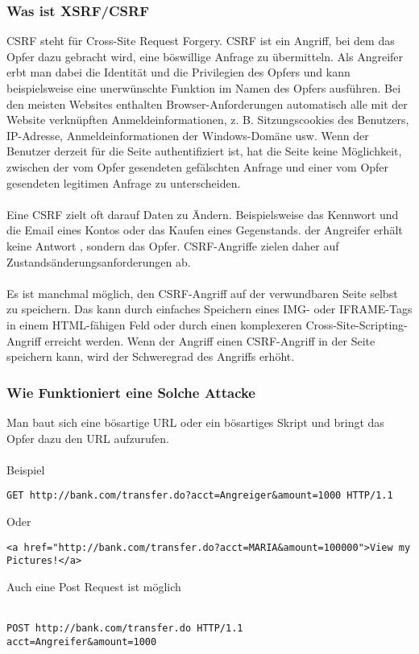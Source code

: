 {\subsubsection{Was ist XSRF/CSRF}
\label{sec:xsrf_what}
CSRF steht für Cross-Site Request Forgery. CSRF ist ein Angriff, bei dem das Opfer dazu gebracht wird, eine böswillige Anfrage zu übermitteln. Als Angreifer erbt man dabei die Identität und die Privilegien des Opfers und kann beispielsweise eine unerwünschte Funktion im Namen des Opfers ausführen. Bei den meisten Websites enthalten Browser-Anforderungen automatisch alle mit der Website verknüpften Anmeldeinformationen, z. B. Sitzungscookies des Benutzers, IP-Adresse, Anmeldeinformationen der Windows-Domäne usw. Wenn der Benutzer derzeit für die Seite authentifiziert ist, hat die Seite keine Möglichkeit, zwischen der vom Opfer gesendeten gefälschten Anfrage und einer vom Opfer gesendeten legitimen Anfrage zu unterscheiden.
\\ \\
Eine CSRF zielt oft darauf Daten zu Ändern. Beispielsweise das Kennwort und die Email eines Kontos oder das Kaufen eines Gegenstands.   der Angreifer erhält keine Antwort , sondern das Opfer. CSRF-Angriffe zielen daher auf Zustandsänderungsanforderungen ab.
\\ \\
Es ist manchmal möglich, den CSRF-Angriff auf der verwundbaren Seite selbst zu speichern. Das kann durch einfaches Speichern eines IMG- oder IFRAME-Tags in einem HTML-fähigen Feld oder durch einen komplexeren Cross-Site-Scripting-Angriff erreicht werden. Wenn der Angriff einen CSRF-Angriff in der Seite speichern kann, wird der Schweregrad des Angriffs erhöht. 

\subsubsection{Wie Funktioniert eine Solche Attacke}
\label{sec:xsrf_how}
Man baut sich eine bösartige URL oder ein bösartiges Skript und bringt das Opfer dazu den URL aufzurufen. 
\\ \\
Beispiel
\begin{lstlisting}
GET http://bank.com/transfer.do?acct=Angreiger&amount=1000 HTTP/1.1
\end{lstlisting}
Oder
\begin{lstlisting}
<a href="http://bank.com/transfer.do?acct=MARIA&amount=100000">View my Pictures!</a>
\end{lstlisting}
Auch eine Post Request ist möglich
\\ \\
\begin{lstlisting}
POST http://bank.com/transfer.do HTTP/1.1
acct=Angreifer&amount=1000
\end{lstlisting}
}
